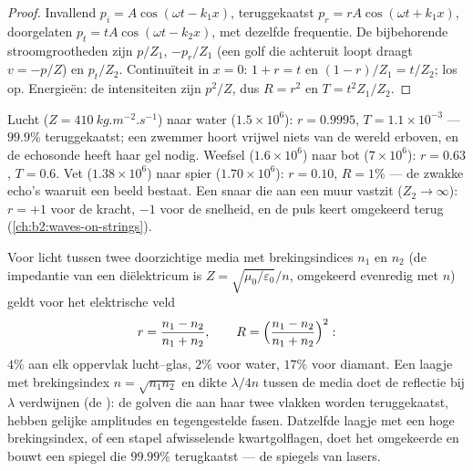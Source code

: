 \begin{proof}
Invallend $p_i = A\cos(\omega t - k_1x)$, teruggekaatst
$p_r = rA\cos(\omega t + k_1x)$, doorgelaten
$p_t = tA\cos(\omega t - k_2x)$, met dezelfde frequentie. De bijbehorende
stroomgrootheden zijn $p/Z_1$, $-p_r/Z_1$ (een golf die achteruit loopt
draagt $v = -p/Z$) en $p_t/Z_2$. Continuïteit in $x = 0$: $1 + r = t$ en
$(1 - r)/Z_1
= t/Z_2$; los op. Energieën: de intensiteiten zijn $p^2/Z$, dus
$R = r^2$ en $T = t^2Z_1/Z_2$.
\end{proof}

\begin{example}\label{ex:b2:wave-interfaces:sound}
Lucht ($Z = \qty{410}{kg.m^{-2}.s^{-1}}$) naar water ($1.5 \times 10^6$):
$r = 0.9995$, $T = 1.1 \times 10^{-3}$ --- $99.9\%$ teruggekaatst; een
zwemmer hoort vrijwel niets van de wereld erboven, en de echosonde heeft
haar gel nodig. Weefsel ($1.6 \times 10^6$) naar bot ($7 \times 10^6$):
$r = 0.63$, $T = 0.6$. Vet ($1.38 \times
10^6$) naar spier
($1.70 \times 10^6$): $r = 0.10$, $R = 1\%$ --- de zwakke echo's waaruit een
beeld bestaat. Een snaar die aan een muur vastzit ($Z_2 \to \infty$):
$r = +1$ voor de kracht, $-1$ voor de snelheid, en de puls keert omgekeerd
terug (\cref{ch:b2:waves-on-strings}).
\end{example}

\begin{proposition}\label{prop:b2:wave-interfaces:optics}
Voor licht tussen twee doorzichtige media met brekingsindices $n_1$ en $n_2$
(de impedantie van een diëlektricum is $Z = \sqrt{\mu_0/\varepsilon_0}/n$,
omgekeerd evenredig met $n$) geldt voor het elektrische veld
\[
r = \frac{n_1 - n_2}{n_1 + n_2} , \qquad R = \Bigl(\frac{n_1 - n_2}{n_1 + n_2}\Bigr)^2 :
\]
$4\%$ aan elk oppervlak lucht--glas, $2\%$ voor water, $17\%$ voor diamant.
Een laagje met brekingsindex $n = \sqrt{n_1n_2}$ en dikte $\lambda/4n$
tussen de media doet de reflectie bij $\lambda$ verdwijnen (de
\emph{}): de golven die aan haar twee vlakken
worden teruggekaatst, hebben gelijke amplitudes en tegengestelde fasen.
Datzelfde laagje met een hoge brekingsindex, of een stapel afwisselende
kwartgolflagen, doet het omgekeerde en bouwt een spiegel die $99.99\%$
terugkaatst --- de spiegels van lasers.
\end{proposition}


